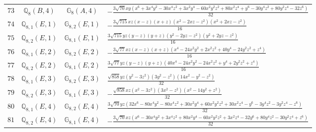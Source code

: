 \documentclass[fleqn,8pt,landscape]{jsarticle}
\begin{document}
\begin{table}[ht!]
\begin{center}
\begin{tabular}{cccl}
$ 73 $ & $ \mathbb{Q}_{8}(B,4) $ & $ \mathbb{G}_{8}(A,4) $ & $ - \frac{3 \sqrt{70} x y \left(x^{6} + 3 x^{4} y^{2} - 30 x^{4} z^{2} + 3 x^{2} y^{4} - 60 x^{2} y^{2} z^{2} + 80 x^{2} z^{4} + y^{6} - 30 y^{4} z^{2} + 80 y^{2} z^{4} - 32 z^{6}\right)}{32} $ \\
$ 74 $ & $ \mathbb{Q}_{8,1}(E,1) $ & $ \mathbb{G}_{8,2}(E,1) $ & $ - \frac{3 \sqrt{715} x z \left(x - z\right) \left(x + z\right) \left(x^{2} - 2 x z - z^{2}\right) \left(x^{2} + 2 x z - z^{2}\right)}{16} $ \\
$ 75 $ & $ \mathbb{Q}_{8,2}(E,1) $ & $ \mathbb{G}_{8,1}(E,1) $ & $ \frac{3 \sqrt{715} y z \left(y - z\right) \left(y + z\right) \left(y^{2} - 2 y z - z^{2}\right) \left(y^{2} + 2 y z - z^{2}\right)}{16} $ \\
$ 76 $ & $ \mathbb{Q}_{8,1}(E,2) $ & $ \mathbb{G}_{8,2}(E,2) $ & $ - \frac{3 \sqrt{77} x z \left(x - z\right) \left(x + z\right) \left(x^{4} - 24 x^{2} y^{2} + 2 x^{2} z^{2} + 40 y^{4} - 24 y^{2} z^{2} + z^{4}\right)}{16} $ \\
$ 77 $ & $ \mathbb{Q}_{8,2}(E,2) $ & $ \mathbb{G}_{8,1}(E,2) $ & $ \frac{3 \sqrt{77} y z \left(y - z\right) \left(y + z\right) \left(40 x^{4} - 24 x^{2} y^{2} - 24 x^{2} z^{2} + y^{4} + 2 y^{2} z^{2} + z^{4}\right)}{16} $ \\
$ 78 $ & $ \mathbb{Q}_{8,1}(E,3) $ & $ \mathbb{G}_{8,2}(E,3) $ & $ \frac{\sqrt{858} y z \left(y^{2} - 3 z^{2}\right) \left(3 y^{2} - z^{2}\right) \left(14 x^{2} - y^{2} - z^{2}\right)}{32} $ \\
$ 79 $ & $ \mathbb{Q}_{8,2}(E,3) $ & $ \mathbb{G}_{8,1}(E,3) $ & $ - \frac{\sqrt{858} x z \left(x^{2} - 3 z^{2}\right) \left(3 x^{2} - z^{2}\right) \left(x^{2} - 14 y^{2} + z^{2}\right)}{32} $ \\
$ 80 $ & $ \mathbb{Q}_{8,1}(E,4) $ & $ \mathbb{G}_{8,2}(E,4) $ & $ \frac{3 \sqrt{70} y z \left(32 x^{6} - 80 x^{4} y^{2} - 80 x^{4} z^{2} + 30 x^{2} y^{4} + 60 x^{2} y^{2} z^{2} + 30 x^{2} z^{4} - y^{6} - 3 y^{4} z^{2} - 3 y^{2} z^{4} - z^{6}\right)}{32} $ \\
$ 81 $ & $ \mathbb{Q}_{8,2}(E,4) $ & $ \mathbb{G}_{8,1}(E,4) $ & $ - \frac{3 \sqrt{70} x z \left(x^{6} - 30 x^{4} y^{2} + 3 x^{4} z^{2} + 80 x^{2} y^{4} - 60 x^{2} y^{2} z^{2} + 3 x^{2} z^{4} - 32 y^{6} + 80 y^{4} z^{2} - 30 y^{2} z^{4} + z^{6}\right)}{32} $ \\
 \hline \hline
\end{tabular}
\end{center}
\end{table}
\end{document}
